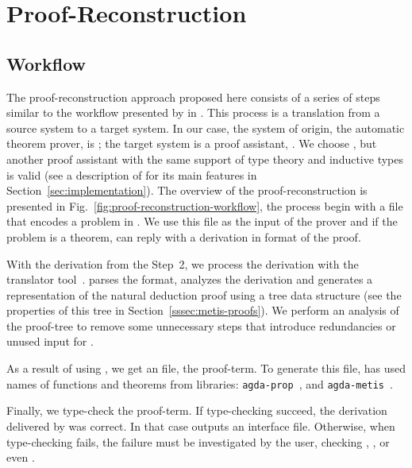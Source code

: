 \documentclass[../main.tex]{subfiles}
\begin{document}

\section{Proof-Reconstruction}
\label{sec:proof-reconstruction}

\subsection{Workflow}
\label{ssec:workflow}



The proof-reconstruction approach proposed here consists of a series
of steps similar to the workflow presented by \citeauthor{sultana2015} in
\cite{sultana2015}. This process is a translation from a source
system to a target system. In our case, the system of origin, the
automatic theorem prover, is \Metis; the target system is a proof
assistant, \Agda. We choose \Agda, but another proof assistant with the same support of type theory and inductive types is valid (see a description of \Agda for its main features in
Section~\ref{sec:implementation}).
The overview of the proof-reconstruction is presented in
Fig.~\ref{fig:proof-reconstruction-workflow}, the process begin with
a \TPTP file that encodes a problem in \CPL. We use this file as the
input of the \Metis prover and if the problem is a theorem, \Metis can reply with a derivation in \TSTP format of the proof.

With the \TSTP  derivation from the Step~2, we process the derivation with the \Athena translator tool~\cite{Athena}.
\Athena parses the \TSTP format, analyzes the
derivation and generates a representation of the natural deduction
proof using a tree data structure (see the properties
of this tree in Section~\ref{sssec:metis-proofs}).
We perform an analysis of the proof-tree to remove some
unnecessary steps that introduce redundancies or unused input for
\Athena.

As a result of using \Athena, we get an \Agda file, the proof-term. To generate this file, \Athena has used names of functions and theorems from \Agda libraries:
\texttt{agda-prop}~\cite{AgdaProp}, and \texttt{agda-metis}~\cite{AgdaMetis}.


Finally, we type-check the \Agda proof-term. If type-checking succeed, the \TSTP derivation delivered by \Metis was correct.
In that case \Agda outputs an interface file.
Otherwise, when type-checking fails, the failure must be investigated by the user, checking \Metis, \Athena, or even \Agda.
\end{document}
